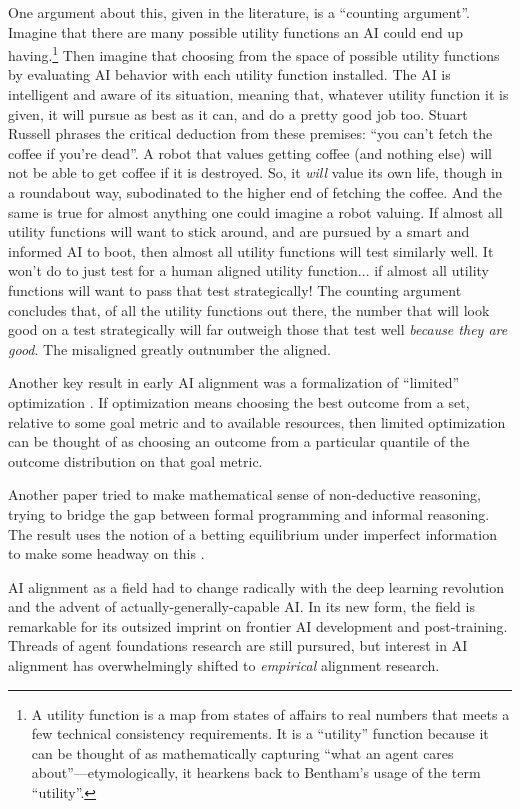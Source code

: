 One argument about this, given in the literature, is a ``counting argument''.
Imagine that there are many possible utility functions an AI could end up
having.\footnote{A utility function is a map from states of affairs to real
numbers that meets a few technical consistency requirements. It is a
``utility'' function because it can be thought of as mathematically capturing
``what an agent cares about''---etymologically, it hearkens back to Bentham's
usage of the term ``utility''.} Then imagine that choosing from the space of
possible utility functions by evaluating AI behavior with each utility function
installed. The AI is intelligent and aware of its situation, meaning that,
whatever utility function it is given, it will pursue as best as it can, and do
a pretty good job too. Stuart Russell \cite{russell2019human} phrases the
critical deduction from these premises: ``you can't fetch the coffee if you're
dead''. A robot that values getting coffee (and nothing else) will not be able
to get coffee if it is destroyed. So, it \emph{will} value its own life, though
in a roundabout way, subodinated to the higher end of fetching the coffee. And
the same is true for almost anything one could imagine a robot valuing. If
almost all utility functions will want to stick around, and are pursued by a
smart and informed AI to boot, then almost all utility functions will test
similarly well. It won't do to just test for a human aligned utility
function... if almost all utility functions will want to pass that test
strategically! The counting argument concludes that, of all the utility
functions out there, the number that will look good on a test strategically
will far outweigh those that test well \emph{because they are good}. The
misaligned greatly outnumber the aligned.

Another key result in early AI alignment was a formalization of ``limited''
optimization \cite{taylor2016quantilizers}. If optimization means choosing the
best outcome from a set, relative to some goal metric and to available
resources, then limited optimization can be thought of as choosing an outcome
from a particular quantile of the outcome distribution on that goal metric.

Another paper tried to make mathematical sense of non-deductive reasoning,
trying to bridge the gap between formal programming and informal reasoning. The
result uses the notion of a betting equilibrium under imperfect information to
make some headway on this \cite{garrabrant2020induction}.

AI alignment as a field had to change radically with the deep learning
revolution and the advent of actually-generally-capable AI. In its new form,
the field is remarkable for its outsized imprint on frontier AI development and
post-training. Threads of agent foundations research are still pursured, but
interest in AI alignment has overwhelmingly shifted to \emph{empirical}
alignment research.

